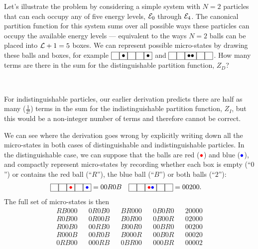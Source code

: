 Let's illustrate the problem by considering a simple system with $N = 2$ particles that can each occupy any of five energy levels, $\mathcal E_0$ through $\mathcal E_4$.
The canonical partition function for this system sums over all possible ways these particles can occupy the available energy levels --- equivalent to the ways $N = 2$ balls can be placed into $\mathcal L + 1 = 5$ boxes.
We can represent possible micro-states by drawing these balls and boxes, for example $\boxzero\boxone\boxzero\boxzero\boxone$ and $\boxzero\boxzero\boxtwo\boxzero\boxzero$.
How many terms are there in the sum for the distinguishable partition function, $Z_D$?
\begin{mdframed}
  \ \\[24 pt]
\end{mdframed}
For indistinguishable particles, our earlier derivation predicts there are half as many ($\frac{1}{2!}$) terms in the sum for the indistinguishable partition function, $Z_I$, but this would be a non-integer number of terms and therefore cannot be correct.

We can see where the derivation goes wrong by explicitly writing down all the micro-states in both cases of distinguishable and indistinguishable particles.
In the distinguishable case, we can suppose that the balls are red ($\textcolor{red}{\bullet}$) and blue ($\textcolor{blue}{\bullet}$), and compactly represent micro-states by recording whether each box is empty (``$0$'') or contains the red ball (``$R$''), the blue ball (``$B$'') or both balls (``$2$''):
\begin{align*}
  \boxzero\boxzero\boxed{\textcolor{red}{\bullet}}\boxzero\boxed{\textcolor{blue}{\bullet}} & = 00R0B &
  \boxzero\boxzero\boxed{\textcolor{red}{\bullet}\textcolor{blue}{\bullet}}\boxzero\boxzero & = 00200.
\end{align*}
The full set of micro-states is then
\begin{align*}
  RB000 & & 0R0B0 & & BR000 & & 0B0R0 & & 20000 \\
  R0B00 & & 0R00B & & B0R00 & & 0B00R & & 02000 \\
  R00B0 & & 00RB0 & & B00R0 & & 00BR0 & & 00200 \\
  R000B & & 00R0B & & B000R & & 00B0R & & 00020 \\
  0RB00 & & 000RB & & 0BR00 & & 000BR & & 00002
\end{align*}

